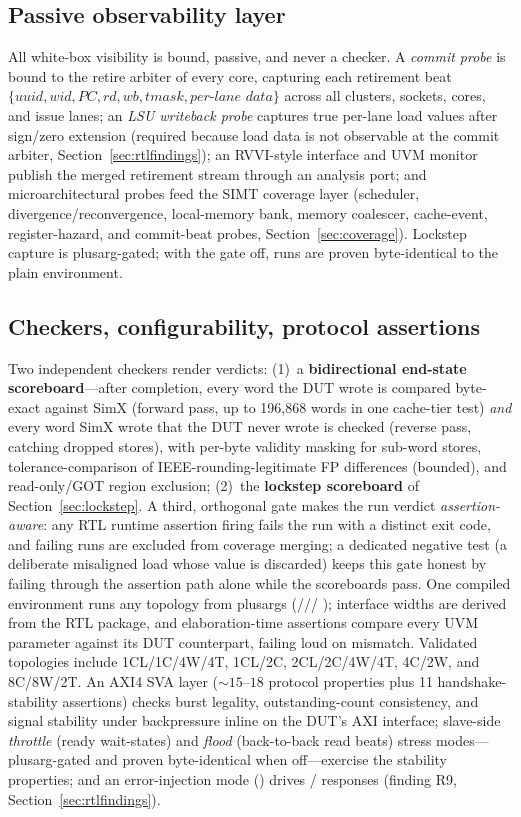 \documentclass[review,12pt]{elsarticle}
\newcommand{\code}[1]{\texttt{\detokenize{#1}}}
\begin{document}
\subsection{Passive observability layer}
All white-box visibility is bound, passive, and never a checker. A
\emph{commit probe} is bound to the retire arbiter of every core,
capturing each retirement beat $\{\textit{uuid}, \textit{wid},
	\textit{PC}, \textit{rd}, \textit{wb}, \textit{tmask},
	\textit{per-lane data}\}$ across all clusters, sockets, cores, and
issue lanes; an \emph{LSU writeback probe} captures true per-lane load
values after sign/zero extension (required because load data is not
observable at the commit arbiter,
Section~\ref{sec:rtlfindings}); an RVVI-style interface and UVM
monitor publish the merged retirement stream through an analysis
port; and microarchitectural probes feed the SIMT coverage layer
(scheduler, divergence/reconvergence, local-memory bank, memory
coalescer, cache-event, register-hazard, and commit-beat probes,
Section~\ref{sec:coverage}). Lockstep capture is plusarg-gated; with
the gate off, runs are proven byte-identical to the plain
environment.

\subsection{Checkers, configurability, protocol assertions}
Two independent checkers render verdicts: (1)~a \textbf{bidirectional
	end-state scoreboard}---after completion, every word the DUT wrote is
compared byte-exact against SimX (forward pass, up to 196{,}868 words
in one cache-tier test) \emph{and} every word SimX wrote that the DUT
never wrote is checked (reverse pass, catching dropped stores), with
per-byte validity masking for sub-word stores,
tolerance-comparison of IEEE-rounding-legitimate FP differences
(bounded), and read-only/GOT region exclusion; (2)~the
\textbf{lockstep scoreboard} of Section~\ref{sec:lockstep}. A third,
orthogonal gate makes the run verdict \emph{assertion-aware}: any RTL
runtime assertion firing fails the run with a distinct exit code, and
failing runs are excluded from coverage merging; a dedicated negative
test (a deliberate misaligned load whose value is discarded) keeps
this gate honest by failing through the assertion path alone while
the scoreboards pass. One compiled environment runs any topology
from plusargs (\code{+CLUSTERS}/\code{+CORES}/\code{+WARPS}/%
\code{+THREADS}); interface widths are derived from the RTL package,
and elaboration-time assertions compare every UVM parameter against
its DUT counterpart, failing loud on mismatch. Validated topologies
include 1CL/1C/4W/4T, 1CL/2C, 2CL/2C/4W/4T, 4C/2W, and 8C/8W/2T. An
AXI4 SVA layer (${\sim}15$--$18$ protocol properties plus 11
handshake-stability assertions) checks burst legality,
outstanding-count consistency, and signal stability under
backpressure inline on the DUT's AXI interface; slave-side
\emph{throttle} (ready wait-states) and \emph{flood} (back-to-back
read beats) stress modes---plusarg-gated and proven byte-identical
when off---exercise the stability properties; and an error-injection
mode (\code{+AXI_INJECT_ERR}) drives \code{SLVERR}/\code{DECERR}
responses (finding R9, Section~\ref{sec:rtlfindings}).
\end{document}
